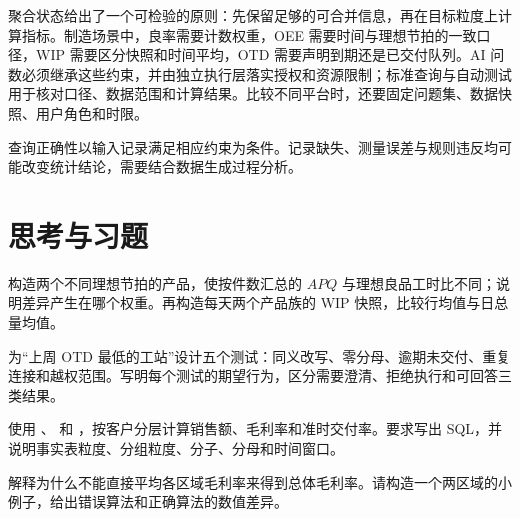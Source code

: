 聚合状态给出了一个可检验的原则：先保留足够的可合并信息，再在目标粒度上计算指标。制造场景中，良率需要计数权重，OEE 需要时间与理想节拍的一致口径，WIP 需要区分快照和时间平均，OTD 需要声明到期还是已交付队列。AI 问数必须继承这些约束，并由独立执行层落实授权和资源限制；标准查询与自动测试用于核对口径、数据范围和计算结果。比较不同平台时，还要固定问题集、数据快照、用户角色和时限。

查询正确性以输入记录满足相应约束为条件。记录缺失、测量误差与规则违反均可能改变统计结论，需要结合数据生成过程分析。


\section*{思考与习题}

\begin{exercise}[制造指标反例]
构造两个不同理想节拍的产品，使按件数汇总的 \(APQ\) 与理想良品工时比不同；说明差异产生在哪个权重。再构造每天两个产品族的 WIP 快照，比较行均值与日总量均值。
\end{exercise}
\begin{exercise}[问数评测]
为“上周 OTD 最低的工站”设计五个测试：同义改写、零分母、逾期未交付、重复连接和越权范围。写明每个测试的期望行为，区分需要澄清、拒绝执行和可回答三类结果。
\end{exercise}

\begin{exercise}
使用 、 和 ，按客户分层计算销售额、毛利率和准时交付率。要求写出 SQL，并说明事实表粒度、分组粒度、分子、分母和时间窗口。
\end{exercise}

\begin{exercise}
解释为什么不能直接平均各区域毛利率来得到总体毛利率。请构造一个两区域的小例子，给出错误算法和正确算法的数值差异。
\end{exercise}

